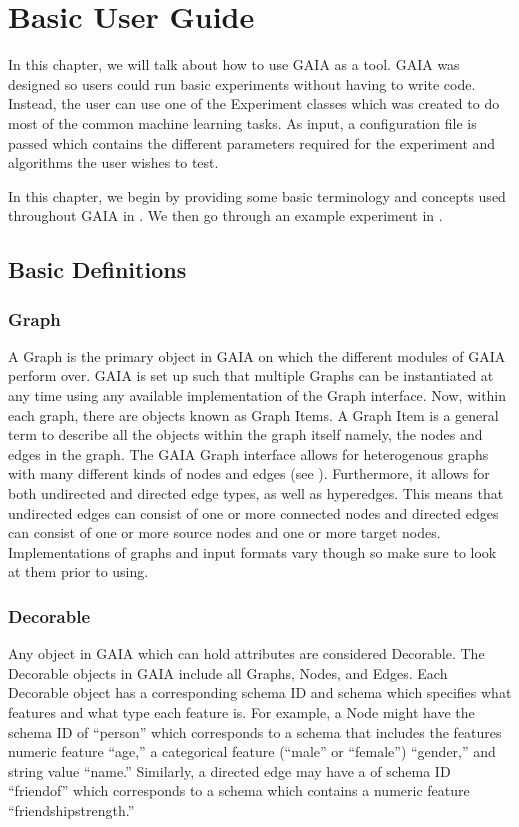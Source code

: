
\chapter{Basic User Guide}
\label{basicuser}
In this chapter, we will talk about how to use GAIA as a tool.  GAIA was designed so
users could run basic experiments without having to write code.  Instead,
the user can use one of the Experiment classes which was created to do most
of the common machine learning tasks.  As input, a configuration file is passed
which contains the different parameters required for the experiment and algorithms
the user wishes to test.

In this chapter, we begin by providing some basic terminology and concepts used
throughout GAIA in .  We then go through an example experiment
in .

\section{Basic Definitions}
\label{basicdefs}
\subsection{Graph}
A Graph is the primary object in GAIA on which the different modules of GAIA
perform over.  GAIA is set up such that multiple Graphs can be instantiated
at any time using any available implementation of the Graph interface.
Now, within each graph, there are objects known as Graph Items.
A Graph Item is a general term to describe all the objects within the graph itself
namely, the nodes and edges in the graph.  The GAIA Graph interface
allows for heterogenous graphs with many different kinds of nodes
and edges (see ).  Furthermore, it allows for both
undirected and directed edge types, as well as hyperedges.  This means
that undirected edges can consist of one or more connected nodes and
directed edges can consist of one or more source nodes and one or more
target nodes.  Implementations of graphs and input formats vary though so
make sure to look at them prior to using.

\subsection{Decorable}
\label{decorable}
Any object in GAIA which can hold attributes are considered Decorable.
The Decorable objects in GAIA include all Graphs, Nodes, and Edges.
Each Decorable object has a corresponding schema ID and schema
which specifies what features and what type each feature is.
For example, a Node might have the schema ID of ``person'' which
corresponds to a schema that includes the features numeric feature ``age,''
a categorical feature (``male'' or ``female'') ``gender,'' and string value ``name.''
Similarly, a directed edge may have a of schema ID ``friendof''
which corresponds to a schema which contains a numeric feature ``friendshipstrength.''

